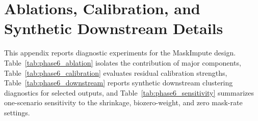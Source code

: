 \documentclass{article}
\theoremstyle{plain}
\theoremstyle{definition}
\theoremstyle{remark}
\begin{document}
\begin{table}[H]
\caption{Scenario-level wins on the synthetic test split. A win is assigned to
the method with the lowest scenario-level mean for the metric.}
\label{tab:benchmark_wins}
\centering
\footnotesize

\end{table}

\begin{table}[H]
\caption{Paired Wilcoxon signed-rank tests comparing MaskImpute against DCA
across synthetic test scenarios. The one-sided test uses the alternative that
MaskImpute has lower error than DCA.}
\label{tab:benchmark_significance}
\centering
\footnotesize

\end{table}

\FloatBarrier
\clearpage
\section{Ablations, Calibration, and Synthetic Downstream Details}
\label{app:ablations}
This appendix reports diagnostic experiments for the MaskImpute design.
Table~\ref{tab:phase6_ablation} isolates the contribution of major components,
Table~\ref{tab:phase6_calibration} evaluates residual calibration strengths,
Table~\ref{tab:phase6_downstream} reports synthetic downstream clustering
diagnostics for selected outputs, and Table~\ref{tab:phase6_sensitivity}
summarizes one-scenario sensitivity to the shrinkage, biozero-weight, and zero
mask-rate settings.
\begin{table}[H]
\caption{MaskImpute component ablations on the synthetic test split. Entries are
means across 13 scenarios; $\pm$ values are 95\% confidence intervals across
scenarios for efficacy, MSE, and Biozero-MSE. ARI and NMI are
cluster-count-matched synthetic downstream scores. Lower is better for error
metrics; higher is better for ARI/NMI.}
\label{tab:phase6_ablation}
\centering
\footnotesize
\resizebox{\textwidth}{!}{}
\end{table}

\begin{table}[H]
\caption{Label-free residual calibration on the synthetic test split. The
calibrated output is $(1-\lambda)X_{\mathrm{MI}}+\lambda X_{\mathrm{obs}}$.
Entries are means across 13 scenarios. Lower is better for error metrics;
higher is better for ARI/NMI.}
\label{tab:phase6_calibration}
\centering
\footnotesize
\resizebox{\textwidth}{!}{}
\end{table}
\end{document}
